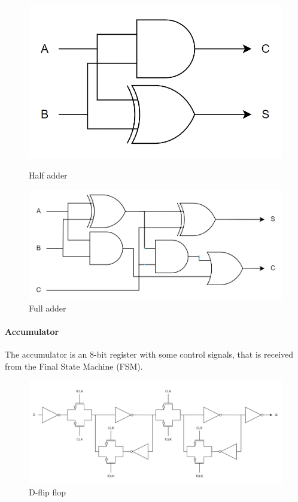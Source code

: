 \begin{figure}[H]
\begin{minipage}{0.4\textwidth}
    \centering
    \includegraphics[width=\linewidth]{Figures/halfadder.png}
    \caption{Half adder}
    \label{fig:halfadder}
\end{minipage}
\begin{minipage}{0.6\textwidth}
    \centering
    \includegraphics[width=\linewidth]{Figures/fulladder.png}
    \caption{Full adder}
    \label{fig:fulladder}
\end{minipage}
\end{figure}



\paragraph{Accumulator}
The accumulator is an 8-bit register with some control signals, that is received from the Final State Machine (FSM). 

\begin{figure}[H]
    \centering
    \includegraphics[width=\textwidth]{Figures/D_Flip_Flop.png}
    \caption{D-flip flop}
    \label{fig:dflipflop}
\end{figure}

